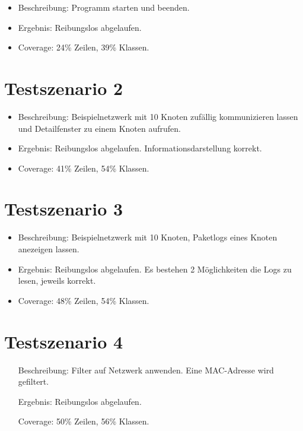 \begin{itemize}
  \item Beschreibung: Programm starten und beenden.
  \item Ergebnis: Reibungslos abgelaufen.
  \item Coverage: 24\% Zeilen, 39\% Klassen.
\end{itemize}

\section{Testszenario 2}

\begin{itemize}
  \item Beschreibung: Beispielnetzwerk mit 10 Knoten zufällig kommunizieren lassen und Detailfenster zu einem Knoten aufrufen.
  \item Ergebnis: Reibungslos abgelaufen. Informationsdarstellung korrekt.
  \item Coverage: 41\% Zeilen, 54\% Klassen.
\end{itemize}

\section{Testszenario 3}

\begin{itemize}
  \item Beschreibung: Beispielnetzwerk mit 10 Knoten, Paketlogs eines Knoten anezeigen lassen.
  \item Ergebnis: Reibungslos abgelaufen. Es bestehen 2 Möglichkeiten die Logs zu lesen, jeweils korrekt.
  \item Coverage: 48\% Zeilen, 54\% Klassen.
\end{itemize}

\section{Testszenario 4}

\begin{enumerate}[leftmargin = *, align=parleft, labelsep=3cm]
  \item[Beschreibung:] Filter auf Netzwerk anwenden. Eine MAC-Adresse wird gefiltert.
  \item[Ergebnis:] Reibungslos abgelaufen.
  \item[Coverage:] 50\% Zeilen, 56\% Klassen.
\end{enumerate}

